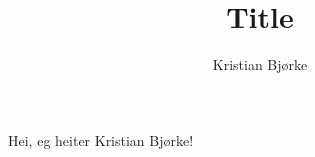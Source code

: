 \documentclass[norsk, a4paper, 11pt]{article}
\title{Title}
\author{Kristian Bjørke}
\begin{document}
\maketitle
Hei, eg heiter Kristian Bjørke!
\end{document}

